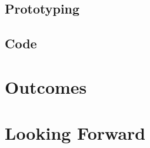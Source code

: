 \documentclass[nofonts,sfsidenotes]{tufte-book}
\begin{document}
		\section{Prototyping}\label{sec:prototyping}
			

		\section{Code}\label{sec:code}
			




	\chapter{Outcomes}\label{ch:outcomes}
		




	\chapter{Looking Forward}\label{ch:looking-forward}
		




	\backmatter
		
		
		
\end{document}
